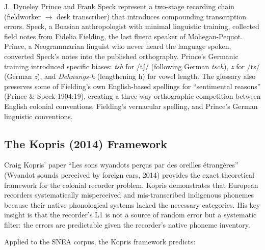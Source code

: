 J.\ Dyneley Prince and Frank Speck represent a two-stage recording chain
(fieldworker $\rightarrow$ desk transcriber) that introduces compounding
transcription errors. Speck, a Boasian anthropologist with minimal linguistic
training, collected field notes from Fidelia Fielding, the last fluent
speaker of Mohegan-Pequot. Prince, a Neogrammarian linguist who never heard
the language spoken, converted Speck's notes into the published orthography.
Prince's Germanic training introduced specific biases: \textit{tsh} for /tʃ/
(following German \textit{tsch}), \textit{z} for /ts/ (German \textit{z}),
and \textit{Dehnungs-h} (lengthening h) for vowel length. The glossary also
preserves some of Fielding's own English-based spellings for ``sentimental
reasons'' (Prince \& Speck 1904:19), creating a three-way orthographic
competition between English colonial conventions, Fielding's vernacular
spelling, and Prince's German linguistic conventions.

\subsection{The Kopris (2014) Framework}

Craig Kopris' paper ``Les sons wyandots perçus par des oreilles étrangères''
(Wyandot sounds perceived by foreign ears, 2014) provides the exact
theoretical framework for the colonial recorder problem. Kopris demonstrates
that European recorders systematically misperceived and mis-transcribed
indigenous phonemes because their native phonological systems lacked the
necessary categories. His key insight is that the recorder's L1 is not a
source of random error but a systematic filter: the errors are predictable
given the recorder's native phoneme inventory.

Applied to the SNEA corpus, the Kopris framework predicts:

